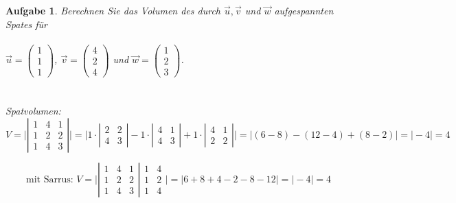\documentclass[12pt]{article}
\newtheorem{exercise}[satz]{Aufgabe}
\begin{document}
     \begin{exercise}
  Berechnen Sie das Volumen des durch $\vec{u}, \vec{v}$ und $\vec{w}$ aufgespannten Spates f\"ur \, \\ \\
  $\vec{u}=\left(\begin{array}{r} 1 \\ 1 \\ 1 \end{array}\right)$,
  $\vec{v}=\left(\begin{array}{r} 4 \\ 2 \\ 4 \end{array}\right)$ und
  $\vec{w}=\left(\begin{array}{r} 1 \\ 2 \\ 3 \end{array}\right)$.\\ \\ \\

  Spatvolumen:
  \[ V=\vert \left| \begin{array}{ccc}
        1 & 4 & 1 \\
        1 & 2 & 2 \\
        1 & 4 & 3 \end{array} \right|\vert
        = \vert 1\cdot \left| \begin{array}{cc} 2 & 2 \\ 4 & 3 \end{array} \right|
              - 1\cdot \left| \begin{array}{cc} 4 & 1 \\ 4 & 3 \end{array} \right|
              + 1\cdot \left| \begin{array}{cc} 4 & 1 \\ 2 & 2 \end{array} \right|
          \vert
        = \vert (6-8) - (12-4) + (8-2) \vert = \vert -4 \vert = 4
  \]  

   

  \[ \textrm{mit Sarrus:}\,\, V=\vert \left| \begin{array}{ccc}
        1 & 4 & 1 \\
        1 & 2 & 2 \\
        1 & 4 & 3 \end{array} \right|
        \begin{array}{cc}
        1 & 4 \\
        1 & 2 \\
        1 & 4 \end{array}
        \vert
        = \vert 6+8+4-2-8-12 \vert = \vert -4 \vert = 4
  \]  

   \end{exercise}

   
\end{document}
